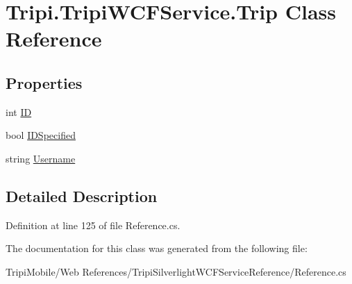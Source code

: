 \hypertarget{class_tripi_1_1_tripi_w_c_f_service_1_1_trip}{
\section{Tripi.TripiWCFService.Trip Class Reference}
\label{class_tripi_1_1_tripi_w_c_f_service_1_1_trip}
}


 
\subsection*{Properties}
\begin{DoxyCompactItemize}
\item 
\hypertarget{class_tripi_1_1_tripi_w_c_f_service_1_1_trip_a4eaf1246e83c1d3c87090519f9beba2d}{
int \hyperlink{class_tripi_1_1_tripi_w_c_f_service_1_1_trip_a4eaf1246e83c1d3c87090519f9beba2d}{ID}}
\label{class_tripi_1_1_tripi_w_c_f_service_1_1_trip_a4eaf1246e83c1d3c87090519f9beba2d}

\begin{DoxyCompactList}\small\item\em \item\end{DoxyCompactList}\item 
\hypertarget{class_tripi_1_1_tripi_w_c_f_service_1_1_trip_ae7dff8ae6aac929bf25a268a544fd0e8}{
bool \hyperlink{class_tripi_1_1_tripi_w_c_f_service_1_1_trip_ae7dff8ae6aac929bf25a268a544fd0e8}{IDSpecified}}
\label{class_tripi_1_1_tripi_w_c_f_service_1_1_trip_ae7dff8ae6aac929bf25a268a544fd0e8}

\begin{DoxyCompactList}\small\item\em \item\end{DoxyCompactList}\item 
\hypertarget{class_tripi_1_1_tripi_w_c_f_service_1_1_trip_a5c72f4d350113888ebd516dea2abb499}{
string \hyperlink{class_tripi_1_1_tripi_w_c_f_service_1_1_trip_a5c72f4d350113888ebd516dea2abb499}{Username}}
\label{class_tripi_1_1_tripi_w_c_f_service_1_1_trip_a5c72f4d350113888ebd516dea2abb499}

\begin{DoxyCompactList}\small\item\em \item\end{DoxyCompactList}\end{DoxyCompactItemize}


\subsection{Detailed Description}


Definition at line 125 of file Reference.cs.

The documentation for this class was generated from the following file:\begin{DoxyCompactItemize}
\item 
TripiMobile/Web References/TripiSilverlightWCFServiceReference/Reference.cs\end{DoxyCompactItemize}
